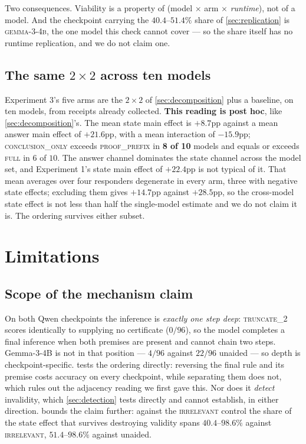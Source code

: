 \documentclass[10pt,twocolumn]{article}
\begin{document}
Two consequences. Viability is a property of (model $\times$ arm $\times$
\emph{runtime}), not of a model. And the checkpoint carrying the $40.4$--$51.4\%$
share of \cref{sec:replication} is \textsc{gemma-3-4b}, the one model this check
cannot cover --- so the share itself has no runtime replication, and we do not
claim one.

\subsection{The same \texorpdfstring{$2\times2$}{2x2} across ten models}

Experiment 3's five arms are the $2\times2$ of \cref{sec:decomposition} plus a
baseline, on ten models, from receipts already collected. \textbf{This reading is
post hoc}, like \cref{sec:decomposition}'s. The mean state main
effect is $+8.7$pp against a mean answer main effect of $+21.6$pp, with a mean
interaction of $-15.9$pp; \textsc{conclusion\_only} exceeds
\textsc{proof\_prefix} in \textbf{8 of 10} models and equals or exceeds
\textsc{full} in $6$ of $10$. The answer channel dominates the state channel across the model set, and
Experiment 1's state main effect of $+22.4$pp is not typical of it. That mean
averages over four responders degenerate in every arm, three with negative state
effects; excluding them gives $+14.7$pp against $+28.5$pp, so the cross-model
state effect is not less than half the single-model estimate and we do not claim
it is. The ordering survives either subset.

\section{Limitations}

\subsection{Scope of the mechanism claim}
\label{sec:mechanism}

On both Qwen checkpoints the inference is \emph{exactly one step deep}:
\textsc{truncate\_2} scores identically to supplying no certificate ($0/96$), so
the model completes a final inference when both premises are present and cannot
chain two steps. Gemma-3-4B is not in that position --- $4/96$ against $22/96$
unaided --- so depth is checkpoint-specific. 
tests the ordering directly: reversing the final rule and its premise costs
accuracy on every checkpoint, while separating them does not, which rules out
the adjacency reading we first gave this. Nor does it \emph{detect} invalidity, which
\cref{sec:detection} tests directly and cannot establish, in either direction.  bounds
the claim further: against the \textsc{irrelevant} control the share of the state effect that survives destroying validity spans
$40.4$--$98.6\%$ against \textsc{irrelevant}, $51.4$--$98.6\%$ against unaided.
\end{document}
